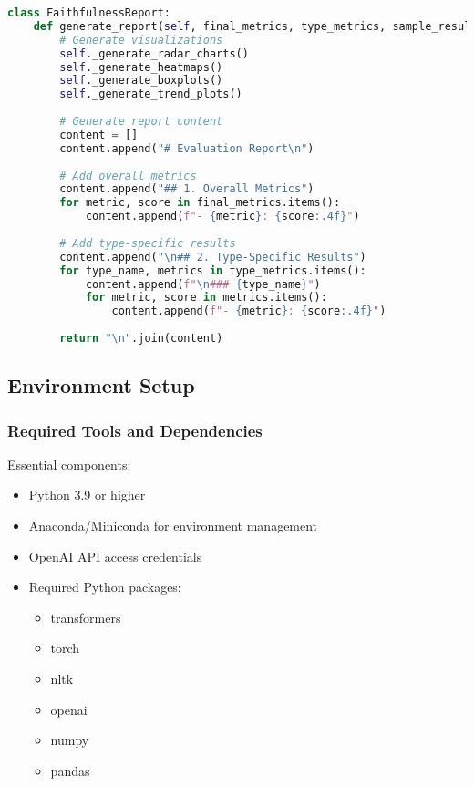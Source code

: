 \begin{lstlisting}[language=Python, breaklines=true, basicstyle=\ttfamily\footnotesize]
class FaithfulnessReport:
    def generate_report(self, final_metrics, type_metrics, sample_results):
        # Generate visualizations
        self._generate_radar_charts()
        self._generate_heatmaps()
        self._generate_boxplots()
        self._generate_trend_plots()
        
        # Generate report content
        content = []
        content.append("# Evaluation Report\n")
        
        # Add overall metrics
        content.append("## 1. Overall Metrics")
        for metric, score in final_metrics.items():
            content.append(f"- {metric}: {score:.4f}")
        
        # Add type-specific results
        content.append("\n## 2. Type-Specific Results")
        for type_name, metrics in type_metrics.items():
            content.append(f"\n### {type_name}")
            for metric, score in metrics.items():
                content.append(f"- {metric}: {score:.4f}")
        
        return "\n".join(content)
\end{lstlisting}

\subsection{Environment Setup}

\subsubsection{Required Tools and Dependencies}
Essential components:
\begin{itemize}
    \item Python 3.9 or higher
    \item Anaconda/Miniconda for environment management
    \item OpenAI API access credentials
    \item Required Python packages:
    \begin{itemize}
        \item transformers
        \item torch
        \item nltk
        \item openai
        \item numpy
        \item pandas
    \end{itemize}
\end{itemize}


